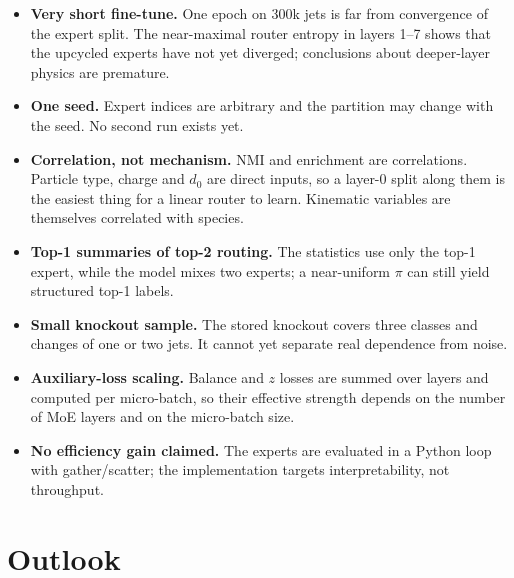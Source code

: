 \documentclass[11pt,a4paper]{article}
\begin{document}
\begin{itemize}
 \item \textbf{Very short fine-tune.} One epoch on 300k jets is far from convergence of the
   expert split. The near-maximal router entropy in layers 1--7 shows that the upcycled
   experts have not yet diverged; conclusions about deeper-layer physics are premature.
 \item \textbf{One seed.} Expert indices are arbitrary and the partition may change with the
   seed. No second run exists yet.
 \item \textbf{Correlation, not mechanism.} NMI and enrichment are correlations. Particle
   type, charge and $d_0$ are direct inputs, so a layer-0 split along them is the easiest
   thing for a linear router to learn. Kinematic variables are themselves correlated with
   species.
 \item \textbf{Top-1 summaries of top-2 routing.} The statistics use only the top-1 expert,
   while the model mixes two experts; a near-uniform $\pi$ can still yield structured top-1
   labels.
 \item \textbf{Small knockout sample.} The stored knockout covers three classes and changes
   of one or two jets. It cannot yet separate real dependence from noise.
 \item \textbf{Auxiliary-loss scaling.} Balance and $z$ losses are summed over layers and
   computed per micro-batch, so their effective strength depends on the number of MoE layers
   and on the micro-batch size.
 \item \textbf{No efficiency gain claimed.} The experts are evaluated in a Python loop with
   gather/scatter; the implementation targets interpretability, not throughput.
\end{itemize}

\section{Outlook}
\end{document}
